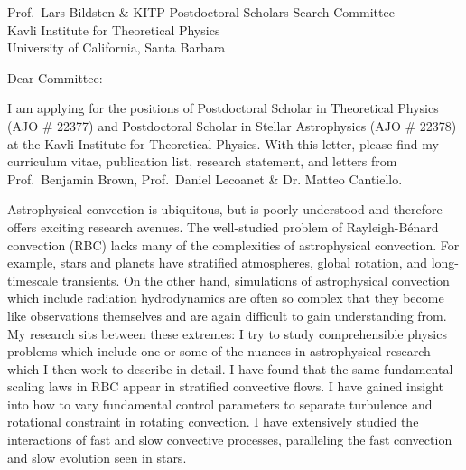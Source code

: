 \documentclass[12pt]{letter}
\begin{document}
\begin{letter}{
               Prof.~Lars Bildsten \& KITP Postdoctoral Scholars Search Committee \\
               Kavli Institute for Theoretical Physics \\
               University of California, Santa Barbara
           }

\opening{Dear Committee:}

    I am applying for the positions of Postdoctoral Scholar in Theoretical Physics (AJO \# 22377) and Postdoctoral Scholar in Stellar Astrophysics (AJO \# 22378) at the Kavli Institute for Theoretical Physics.
    With this letter, please find my curriculum vitae, publication list, research statement, and letters from Prof.~Benjamin Brown, Prof.~Daniel Lecoanet \& Dr. Matteo Cantiello.

    Astrophysical convection is ubiquitous, but is poorly understood and therefore offers exciting research avenues.
    The well-studied problem of Rayleigh-B\'{e}nard convection (RBC) lacks many of the complexities of astrophysical convection.
    For example, stars and planets have stratified atmospheres, global rotation, and long-timescale transients.
    On the other hand, simulations of astrophysical convection which include radiation hydrodynamics are often so complex that they become like observations themselves and are again difficult to gain understanding from.
    My research sits between these extremes: I try to study comprehensible physics problems which include one or some of the nuances in astrophysical research which I then work to describe in detail.
    I have found that the same fundamental scaling laws in RBC appear in stratified convective flows.
    I have gained insight into how to vary fundamental control parameters to separate turbulence and rotational constraint in rotating convection.
    I have extensively studied the interactions of fast and slow convective processes, paralleling the fast convection and slow evolution seen in stars.


\end{letter}
\end{document}
